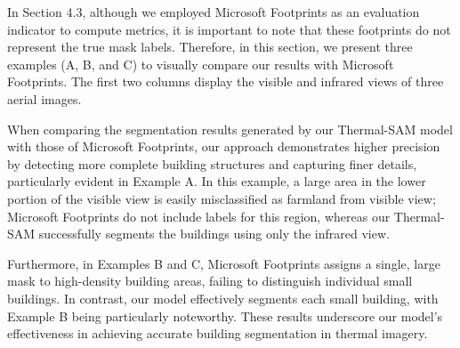 \documentclass{article}
\theoremstyle{plain}
\theoremstyle{definition}
\theoremstyle{remark}
\begin{document}
In Section 4.3, although we employed Microsoft Footprints as an evaluation indicator to compute metrics, it is important to note that these footprints do not represent the true mask labels. Therefore, in this section, we present three examples (A, B, and C) to visually compare our results with Microsoft Footprints. The first two columns display the visible and infrared views of three aerial images. 

When comparing the segmentation results generated by our Thermal-SAM model with those of Microsoft Footprints, our approach demonstrates higher precision by detecting more complete building structures and capturing finer details, particularly evident in Example A. In this example, a large area in the lower portion of the visible view is easily misclassified as farmland from visible view; Microsoft Footprints do not include labels for this region, whereas our Thermal-SAM successfully segments the buildings using only the infrared view.

Furthermore, in Examples B and C, Microsoft Footprints assigns a single, large mask to high-density building areas, failing to distinguish individual small buildings. In contrast, our model effectively segments each small building, with Example B being particularly noteworthy. These results underscore our model's effectiveness in achieving accurate building segmentation in thermal imagery.
\end{document}
